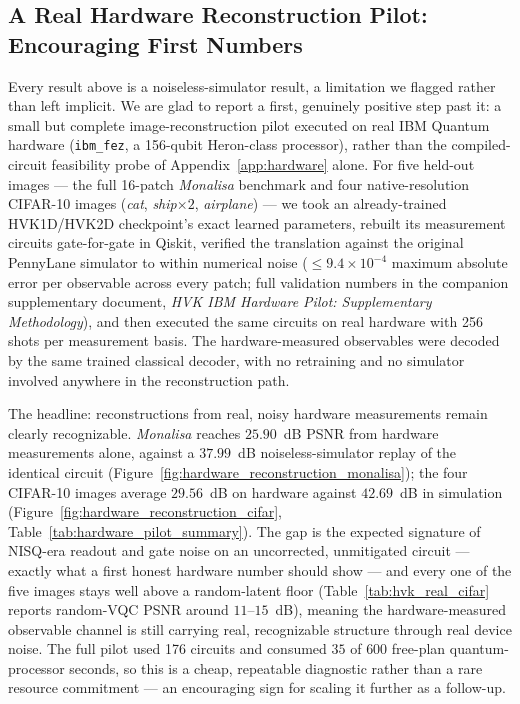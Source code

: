 \documentclass[journal]{IEEEtran}
\begin{document}
\subsection{A Real Hardware Reconstruction Pilot: Encouraging First Numbers}
\label{sec:hardware_pilot}
Every result above is a noiseless-simulator result, a limitation we flagged rather than left implicit. We are glad to report a first, genuinely positive step past it: a small but complete image-reconstruction pilot executed on real IBM Quantum hardware (\texttt{ibm\_fez}, a 156-qubit Heron-class processor), rather than the compiled-circuit feasibility probe of Appendix~\ref{app:hardware} alone. For five held-out images --- the full 16-patch \textit{Monalisa} benchmark and four native-resolution CIFAR-10 images (\textit{cat}, \textit{ship}$\times2$, \textit{airplane}) --- we took an already-trained HVK1D/HVK2D checkpoint's exact learned parameters, rebuilt its measurement circuits gate-for-gate in Qiskit, verified the translation against the original PennyLane simulator to within numerical noise ($\leq 9.4\times10^{-4}$ maximum absolute error per observable across every patch; full validation numbers in the companion supplementary document, \textit{HVK IBM Hardware Pilot: Supplementary Methodology}), and then executed the same circuits on real hardware with 256 shots per measurement basis. The hardware-measured observables were decoded by the same trained classical decoder, with no retraining and no simulator involved anywhere in the reconstruction path.

The headline: reconstructions from real, noisy hardware measurements remain clearly recognizable. \textit{Monalisa} reaches $25.90$~dB PSNR from hardware measurements alone, against a $37.99$~dB noiseless-simulator replay of the identical circuit (Figure~\ref{fig:hardware_reconstruction_monalisa}); the four CIFAR-10 images average $29.56$~dB on hardware against $42.69$~dB in simulation (Figure~\ref{fig:hardware_reconstruction_cifar}, Table~\ref{tab:hardware_pilot_summary}). The gap is the expected signature of NISQ-era readout and gate noise on an uncorrected, unmitigated circuit --- exactly what a first honest hardware number should show --- and every one of the five images stays well above a random-latent floor (Table~\ref{tab:hvk_real_cifar} reports random-VQC PSNR around $11$--$15$~dB), meaning the hardware-measured observable channel is still carrying real, recognizable structure through real device noise. The full pilot used 176 circuits and consumed $35$ of $600$ free-plan quantum-processor seconds, so this is a cheap, repeatable diagnostic rather than a rare resource commitment --- an encouraging sign for scaling it further as a follow-up.
\end{document}
